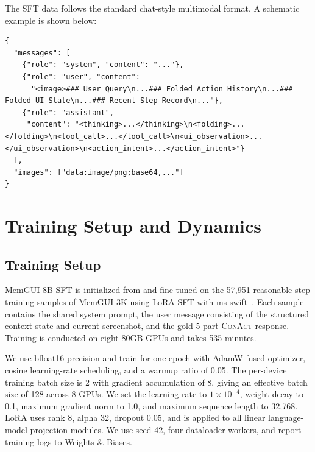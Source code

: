\documentclass{llmxive}
\providecommand{\llmname}[1]{{\fontfamily{pcr}\selectfont{#1}}}
\providecommand{\conact}{\textsc{ConAct}\xspace}
\begin{document}
The SFT data follows the standard chat-style multimodal format. A schematic example is shown below:
\begin{Verbatim}[fontsize=\scriptsize,breaklines,breakanywhere]
{
  "messages": [
    {"role": "system", "content": "..."},
    {"role": "user", "content":
      "<image>### User Query\n...### Folded Action History\n...### Folded UI State\n...### Recent Step Record\n..."},
    {"role": "assistant",
     "content": "<thinking>...</thinking>\n<folding>...</folding>\n<tool_call>...</tool_call>\n<ui_observation>...</ui_observation>\n<action_intent>...</action_intent>"}
  ],
  "images": ["data:image/png;base64,..."]
}
\end{Verbatim}

\section{Training Setup and Dynamics}
\label{sec:appendix-train}

\subsection{Training Setup}
\label{sec:appendix-training-setup}

MemGUI-8B-SFT is initialized from \llmname{Qwen3-VL-8B-Instruct} and fine-tuned on the 57{,}951 reasonable-step training samples of MemGUI-3K using LoRA SFT with ms-swift~\cite{zhao2024swift}. Each sample contains the shared system prompt, the user message consisting of the structured context state and current screenshot, and the gold 5-part \conact response. Training is conducted on eight 80GB GPUs and takes 535 minutes.

We use bfloat16 precision and train for one epoch with AdamW fused optimizer, cosine learning-rate scheduling, and a warmup ratio of 0.05. The per-device training batch size is 2 with gradient accumulation of 8, giving an effective batch size of 128 across 8 GPUs. We set the learning rate to $1\times10^{-4}$, weight decay to 0.1, maximum gradient norm to 1.0, and maximum sequence length to 32{,}768. LoRA uses rank 8, alpha 32, dropout 0.05, and is applied to all linear language-model projection modules. We use seed 42, four dataloader workers, and report training logs to Weights \& Biases.
\end{document}
